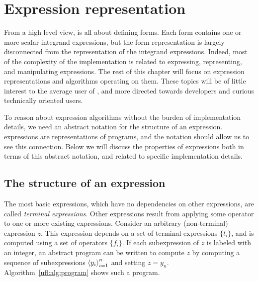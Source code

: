 \section{Expression representation}
\label{ufl:sec:representation}

From a high level view, \ufl{} is all about defining forms.  Each form
contains one or more scalar integrand expressions, but the form
representation is largely disconnected from the representation of the
integrand expressions.  Indeed, most of the complexity of the \ufl{}
implementation is related to expressing, representing, and manipulating
expressions.  The rest of this chapter will focus on expression
representations and algorithms operating on them.  These topics will
be of little interest to the average user of \ufl{}, and more directed
towards developers and curious technically oriented users.

To reason about expression algorithms without the burden of implementation
details, we need an abstract notation for the structure of an expression.
\ufl{} expressions are representations of programs, and the notation
should allow us to see this connection. Below we will discuss the
properties of expressions both in terms of this abstract notation,
and related to specific implementation details.
\subsection{The structure of an expression}
\label{ufl:sec:expressions}

The most basic expressions, which have no dependencies on other
expressions, are called \emph{terminal expressions}.  Other expressions
result from applying some operator to one or more existing expressions.
Consider an arbitrary (non-terminal) expression $z$.  This expression
depends on a set of terminal expressions $\{ t_i \}$, and is computed
using a set of operators $\{ f_i \}$.  If each subexpression of $z$ is
labeled with an integer, an abstract program can be written to compute
$z$ by computing a sequence of subexpressions $\left\langle{y_i}\right\rangle_{i=1}^n$ and
setting $z = y_n$.  Algorithm~\ref{ufl:alg:program} shows such a program.

